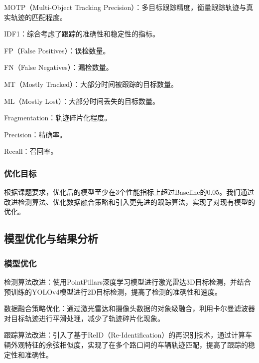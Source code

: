 MOTP（Multi-Object Tracking Precision）：多目标跟踪精度，衡量跟踪轨迹与真实轨迹的匹配程度。

IDF1：综合考虑了跟踪的准确性和稳定性的指标。

FP（False Positives）：误检数量。

FN（False Negatives）：漏检数量。

MT（Mostly Tracked）：大部分时间被跟踪的目标数量。

ML（Mostly Lost）：大部分时间丢失的目标数量。

Fragmentation：轨迹碎片化程度。

Precision：精确率。

Recall：召回率。
\subsubsection{优化目标}
根据课题要求，优化后的模型至少在3个性能指标上超过Baseline的0.05。我们通过改进检测算法、优化数据融合策略和引入更先进的跟踪算法，实现了对现有模型的优化。

\subsection{模型优化与结果分析}
\subsubsection{模型优化}
检测算法改进：使用PointPillars深度学习模型进行激光雷达3D目标检测，并结合预训练的YOLOv4模型进行2D目标检测，提高了检测的准确性和速度。

数据融合策略优化：通过激光雷达和摄像头数据的对象级融合，利用卡尔曼滤波器对目标轨迹进行平滑处理，减少了轨迹碎片化现象。

跟踪算法改进：引入了基于ReID（Re-Identification）的再识别技术，通过计算车辆外观特征的余弦相似度，实现了在多个路口间的车辆轨迹匹配，提高了跟踪的稳定性和准确性。

